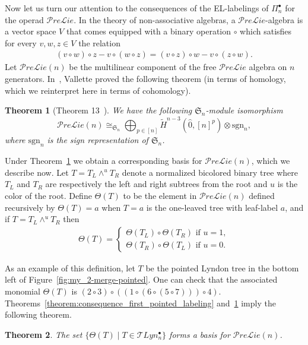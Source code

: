 \documentclass[11pt]{article}
\newtheorem{theo}{Theorem}[section]
\theoremstyle{definition}
\numberwithin{equation}{section}
\newcommand{\sym}{\mathfrak{S}}
\newcommand{\Prelie}{\mathcal{P}re\mathcal{L}ie}
\newcommand{\sgn}{\mathrm{sgn}}
\begin{document}
Now let us turn our attention to the consequences of the EL-labelings of $\Pi_n^\bullet$ for the operad $\Prelie$. In the theory of non-associative algebras, a $\Prelie$-algebra is a vector space $V$ that comes equipped with a binary operation $\circ$ which satisfies for every $v,w,z \in V$ the relation
 \begin{align*}
     (v \circ w) \circ z - v \circ (w \circ z) =(v \circ z) \circ w - v \circ (z \circ w).
 \end{align*}
 Let $\Prelie(n)$ be the multilinear component of the free $\Prelie$ algebra on $n$ generators. In~\cite{Vallette2007}, Vallette 
 proved the following theorem (in terms of homology, which we reinterpret here in terms of cohomology).

 \begin{theo}[Theorem 13~\cite{Vallette2007}]\label{theorem:vallette_prelie}
 We have the following $\sym_n$-module isomorphism
$$\Prelie(n)\cong_{\sym_n}\bigoplus_{p\in[n]}\widetilde H^{n-3}(\hat{0},[n]^p)\otimes \sgn_{n},$$
 where $\sgn_n$ is the sign representation of $\sym_n$.
 \end{theo}
 
 Under Theorem~\ref{theorem:vallette_prelie} we obtain a corresponding basis for $\Prelie(n)$, which we describe now. Let  $T= T_L \wedge^u T_R$ denote a normalized bicolored binary tree where $T_L$ and $T_R$ are respectively the left and right subtrees from the root and $u$ is the color of the root.
 Define $\Theta(T)$ to be the element in $\Prelie(n)$ defined recursively by $\Theta(T)=a$ when $T=a$ is the one-leaved tree with leaf-label $a$, and if $T=T_L \wedge^u T_R$ then
 \begin{align*}
     \Theta(T)=\begin{cases}
         \Theta(T_L)\circ \Theta(T_R) \text{ if } u=1,\\
         \Theta(T_R)\circ \Theta(T_L) \text{ if } u=0.
     \end{cases}
 \end{align*}
   

     As an example of this definition, let $T$ be the  pointed Lyndon tree in the bottom left of Figure~\ref{fig:my_2-merge-pointed}.  One can check that the associated monomial $\Theta(T)$ is $(2\circ 3)\circ ((1\circ (6 \circ (5\circ 7))) \circ 4)$. Theorems~\ref{theorem:consequence_first_pointed_labeling} and~\ref{theorem:vallette_prelie} imply the following theorem.

     
    \begin{theo}\label{theorem:pointed_lyndon_basis_prelie}
The set
$\{\Theta(T) \mid T\in \mathcal{T}Lyn_{n}^{\bullet}\}$ forms a basis for $\mathcal{P}re\mathcal{L}ie(n)$.
    \end{theo}
\end{document}
